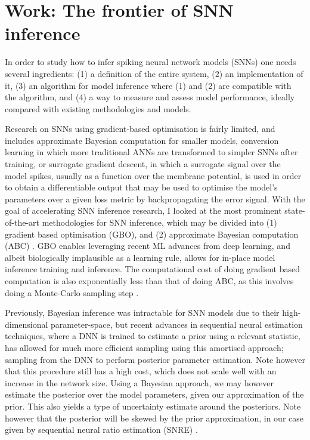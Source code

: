 \documentclass[mphil,deptreport,ai]{infthesis} %
\begin{document}
\chapter{Work: The frontier of SNN inference}

In order to study how to infer spiking neural network models (SNNs) one needs several ingredients: (1) a definition of the entire system, (2) an implementation of it, (3) an algorithm for model inference where (1) and (2) are compatible with the algorithm, and (4) a way to measure and assess model performance, ideally compared with existing methodologies and models.

Research on SNNs using gradient-based optimisation is fairly limited, and includes approximate Bayesian computation for smaller models, conversion learning in which more traditional ANNs are transformed to simpler SNNs after training, or surrogate gradient descent, in which a surrogate signal over the model spikes, usually as a function over the membrane potential, is used in order to obtain a differentiable output that may be used to optimise the model's parameters over a given loss metric by backpropagating the error signal.
With the goal of accelerating SNN inference research, I looked at the most prominent state-of-the-art methodologies for SNN inference, which may be divided into (1) gradient based optimisation (GBO), and (2) approximate Bayesian computation (ABC) \cite{Lueckmann2018, Rene2020, Cranmer2020a, Lueckmann2021}.
GBO enables leveraging recent ML advances from deep learning, and albeit biologically implausible as a learning rule, allows for in-place model inference training and inference. The computational cost of doing gradient based computation is also exponentially less than that of doing ABC, as this involves doing a Monte-Carlo sampling step \cite{Rene2020}.

Previously, Bayesian inference was intractable for SNN models due to their high-dimensional parameter-space, but recent advances in sequential neural estimation techniques, where a DNN is trained to estimate a prior using a relevant statistic, has allowed for much more efficient sampling using this amortised approach; sampling from the DNN to perform posterior parameter estimation.
Note however that this procedure still has a high cost, which does not scale well with an increase in the network size.
Using a Bayesian approach, we may however estimate the posterior over the model parameters, given our approximation of the prior. This also yields a type of uncertainty estimate around the posteriors. Note however that the posterior will be skewed by the prior approximation, in our case given by sequential neural ratio estimation (SNRE) \cite{Lueckmann2021}.
 
\end{document}
